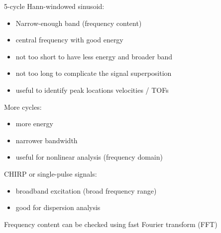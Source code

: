 \documentclass[10pt,aspectratio=169,dvipsnames]{beamer} %
\begin{document}
	\begin{frame}
		5-cycle Hann-windowed sinusoid:
		\begin{itemize}
			\item Narrow-enough band (frequency content)
			\item central frequency with good energy
			\item not too short to have less energy and broader band
			\item not too long to complicate the signal superposition
			\item useful to identify peak locations  velocities / TOFs
		\end{itemize}
				
		More cycles:
		\begin{itemize}
			\item more energy
			\item narrower bandwidth
			\item useful for nonlinear analysis (frequency domain)
		\end{itemize}
		
		CHIRP or single-pulse signals:
		\begin{itemize}
			\item broadband excitation (broad frequency range)
			\item good for dispersion analysis
		\end{itemize}
		Frequency content can be checked using fast Fourier transform (FFT)
	\end{frame}
\end{document}
